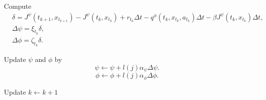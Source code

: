 \documentclass[11pt]{article}
\newcommand{\1}{\mathbbm{1}}
\begin{document}
\begin{algorithm}[hbtp]
\begin{algorithmic}
{{Compute
\[ \begin{aligned}
& \delta = J^{\psi}(t_{k+1},x_{t_{k+1}}) - J^{\psi}(t_{k},x_{t_{k}}) + r_{t_k}\Delta t -q^{\phi}(t_{k},x_{t_{k}},a_{t_k})\Delta t - \beta J^{\psi}(t_{k},x_{t_{k}}) \Delta t ,\\
& \Delta\psi = \xi_{t_k} \delta, \\
& \Delta\phi = \zeta_{t_k} \delta.
\end{aligned} \]

Update $\psi$ and $\phi$ by
\[ \psi \leftarrow \psi + l(j)\alpha_{\psi} \Delta\psi.\]
\[ \phi \leftarrow \phi + l(j)\alpha_{\phi} \Delta\phi .  \]

Update $k \leftarrow k + 1$
}
\ENDWHILE	

}
\ENDFOR
\end{algorithmic}
\label{algo:online incremental}
\end{algorithm}
\end{document}
